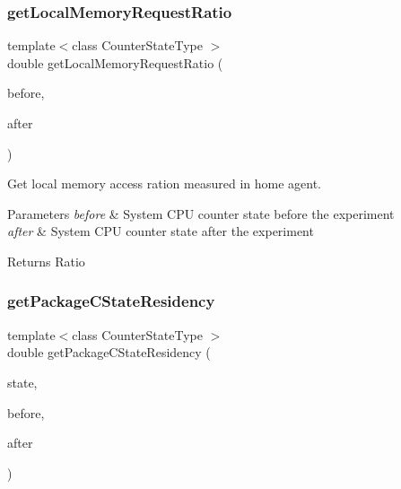 \subsubsection{get\+Local\+Memory\+Request\+Ratio}
{\footnotesize\ttfamily template$<$class Counter\+State\+Type $>$ \\
double get\+Local\+Memory\+Request\+Ratio (\begin{DoxyParamCaption}\item[{const Counter\+State\+Type \&}]{before,  }\item[{const Counter\+State\+Type \&}]{after }\end{DoxyParamCaption})\hspace{0.3cm}{\ttfamily [friend]}}



Get local memory access ration measured in home agent. 


\begin{DoxyParams}{Parameters}
{\em before} & System C\+PU counter state before the experiment \\
\hline
{\em after} & System C\+PU counter state after the experiment \\
\hline
\end{DoxyParams}
\begin{DoxyReturn}{Returns}
Ratio 
\end{DoxyReturn}
\mbox{\label{classUncoreCounterState_a5e34f7b0326dda86b54fcb7bb84a0b38}} 
\subsubsection{get\+Package\+C\+State\+Residency\hspace{0.1cm}{\footnotesize\ttfamily [1/2]}}
{\footnotesize\ttfamily template$<$class Counter\+State\+Type $>$ \\
double get\+Package\+C\+State\+Residency (\begin{DoxyParamCaption}\item[{int}]{state,  }\item[{const Counter\+State\+Type \&}]{before,  }\item[{const Counter\+State\+Type \&}]{after }\end{DoxyParamCaption})\hspace{0.3cm}{\ttfamily [friend]}}



